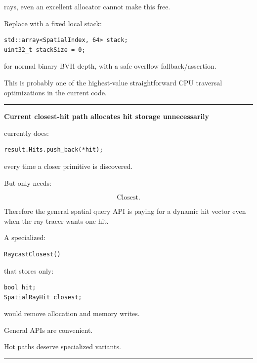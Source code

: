 rays, even an excellent allocator cannot make this free.

Replace with a fixed local stack:

\begin{verbatim}
std::array<SpatialIndex, 64> stack;
uint32_t stackSize = 0;
\end{verbatim}

for normal binary BVH depth, with a safe overflow fallback/assertion.

This is probably one of the highest-value straightforward CPU traversal optimizations in the current code.

\begin{center}\rule{0.5\linewidth}{0.5pt}\end{center}

\textbf{Current closest-hit path allocates hit storage unnecessarily}

 currently does:

\begin{verbatim}
result.Hits.push_back(*hit);
\end{verbatim}

every time a closer primitive is discovered.

But  only needs:

\[
\text{Closest}.
\]

Therefore the general spatial query API is paying for a dynamic hit vector even when the ray tracer wants one hit.

A specialized:

\begin{verbatim}
RaycastClosest()
\end{verbatim}

that stores only:

\begin{verbatim}
bool hit;
SpatialRayHit closest;
\end{verbatim}

would remove allocation and memory writes.

General APIs are convenient.

Hot paths deserve specialized variants.

\begin{center}\rule{0.5\linewidth}{0.5pt}\end{center}

